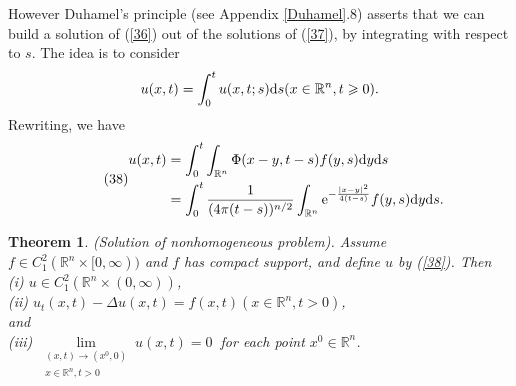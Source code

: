 \documentclass[hyperref,UTF8,12pt]{article}
\numberwithin{equation}{subsection}
\theoremstyle{plain}
\newtheorem{theorem}{Theorem}
\theoremstyle{definition}
\numberwithin{theorem}{section}
\numberwithin{lemma}{section}
\numberwithin{proposition}{section}
\numberwithin{remark}{section}
\numberwithin{corollary}{section}
\numberwithin{definition}{section}
\numberwithin{problem}{section}
\numberwithin{example}{section}
\def\e{\textup{e}}
\def\dif{\textup{d}}
\newcommand{\limls}{\lim\limits}
\newcommand{\mr}{\mathbb{R}}
\renewcommand{\geq}{\geqslant}
\begin{document}
However Duhamel's principle (see Appendix \ref{Duhamel}.8) asserts that we can build a solution of (\ref{36}) out of the solutions of (\ref{37}), by integrating with respect to $s$. The idea is to consider\[u(x,t)=\int_0^tu(x,t;s)\dif s(x\in\mr^n,t\geq0).\]Rewriting, we have
\[\tag{38}\label{38}\begin{aligned}
	u(x,t)&=\int_0^t\int_{\mr^n}\Phi(x-y,t-s)f(y,s)\dif y\dif s\\
	&=\int_0^t\frac{1}{(4\pi(t-s))^{n/2}}\int_{\mr^n}\e^{-\frac{|x-y|^2}{4(t-s)}}f(y,s) \dif y\dif s.
\end{aligned}\]
\begin{theorem}\label{thm2.18}
(Solution of nonhomogeneous problem). Assume $f\in C_1^2(\mr^n\times[0,\infty))$ and $f$ has compact support, and define $u$ by \textup{(\ref{38})}. Then\\
\textup{(i)} $u\in C_1^2(\mr^n\times(0,\infty))$,\\
\textup{(ii)} $u_t(x,t)-\Delta u(x,t)=f(x,t)(x\in\mr^n,t>0)$,\\
and\\
\textup{(iii)} $\limls_{\substack{(x,t)\to(x^0,0)\\x\in\mr^n,t>0}}u(x,t)=0~$ for each point $x^0\in\mr^n$.
\end{theorem}
\end{document}

